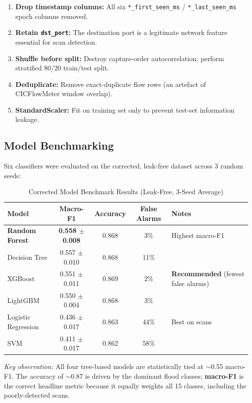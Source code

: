 \documentclass[11pt, a4paper]{article}
\begin{document}
\begin{enumerate}[leftmargin=1.6em, itemsep=0.3em]
    \item \textbf{Drop timestamp columns:} All six \texttt{*\_first\_seen\_ms} / \texttt{*\_last\_seen\_ms} epoch columns removed.
    \item \textbf{Retain \texttt{dst\_port}:} The destination port is a legitimate network feature essential for scan detection.
    \item \textbf{Shuffle before split:} Destroy capture-order autocorrelation; perform stratified 80/20 train/test split.
    \item \textbf{Deduplicate:} Remove exact-duplicate flow rows (an artefact of CICFlowMeter window overlap).
    \item \textbf{StandardScaler:} Fit on training set only to prevent test-set information leakage.
\end{enumerate}

\subsection{Model Benchmarking}

Six classifiers were evaluated on the corrected, leak-free dataset across 3 random seeds:

\begin{table}[H]
\centering
\caption{Corrected Model Benchmark Results (Leak-Free, 3-Seed Average)}
\begin{tabular}{|l|c|c|c|l|}
    \hline
    \textbf{Model} & \textbf{Macro-F1} & \textbf{Accuracy} & \textbf{False Alarms} & \textbf{Notes} \\ \hline
    \textbf{Random Forest} & \textbf{0.558 $\pm$ 0.008} & 0.868 & 3\% & Highest macro-F1 \\ \hline
    Decision Tree & 0.557 $\pm$ 0.010 & 0.868 & 11\% & \\ \hline
    XGBoost & 0.551 $\pm$ 0.011 & 0.869 & 2\% & \textbf{Recommended} (fewest false alarms) \\ \hline
    LightGBM & 0.550 $\pm$ 0.004 & 0.868 & 3\% & \\ \hline
    Logistic Regression & 0.436 $\pm$ 0.017 & 0.863 & 44\% & Best on scans \\ \hline
    SVM & 0.411 $\pm$ 0.017 & 0.862 & 58\% & \\ \hline
\end{tabular}
\end{table}

\noindent
\textit{Key observation:} All four tree-based models are statistically tied at $\sim$0.55 macro-F1. The accuracy of $\sim$0.87 is driven by the dominant flood classes; \textbf{macro-F1} is the correct headline metric because it equally weights all 15 classes, including the poorly-detected scans.
\end{document}
